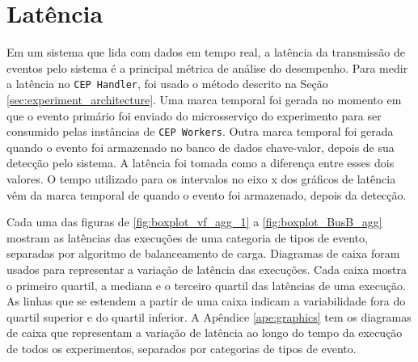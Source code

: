 \newpage


\section{Latência}
\label{sec:latency}







Em um sistema que lida com dados em tempo real, a latência da transmissão de eventos pelo sistema é a principal métrica de análise do desempenho. Para medir a latência no \texttt{CEP Handler}, foi usado o método descrito na Seção  \ref{sec:experiment_architecture}. Uma marca temporal foi gerada no momento em que o evento primário foi enviado do microsserviço do experimento para ser consumido pelas instâncias de \texttt{CEP Workers}. Outra marca temporal foi gerada quando o evento foi armazenado no banco de dados chave-valor, depois de sua detecção pelo sistema. A latência foi tomada como a diferença entre esses dois valores. O tempo utilizado para os intervalos no eixo x dos gráficos de latência vêm da marca temporal de quando o evento foi armazenado, depois da detecção. 

Cada uma das figuras de \ref{fig:boxplot_vf_agg_1} a \ref{fig:boxplot_BusB_agg} mostram as latências das execuções de uma categoria de tipos de evento, separadas por algoritmo de balanceamento de carga. Diagramas de caixa foram usados para representar a variação de latência das execuções. Cada caixa mostra o primeiro quartil, a mediana e o terceiro quartil das latências de uma execução.  As linhas que se estendem a partir de uma caixa indicam a variabilidade fora do quartil superior e do quartil inferior. A Apêndice \ref{ape:graphics} tem os diagramas de caixa que representam a variação de latência ao longo do tempo da execução de todos os experimentos, separados por categorias de tipos de evento.


